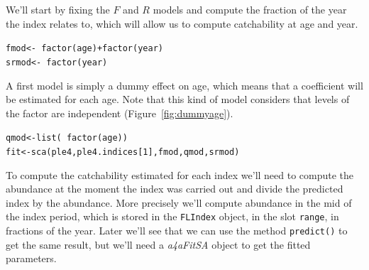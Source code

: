 \documentclass[a4paper,english,10pt]{article}\usepackage[]{graphicx}\usepackage[]{color}
\makeatletter
\newcommand{\hlnum}[1]{\textcolor[rgb]{0.2,0.2,0.2}{#1}}%
\newcommand{\hlopt}[1]{\textcolor[rgb]{0.2,0.2,0.2}{#1}}%
\newcommand{\hlstd}[1]{\textcolor[rgb]{0,0,0}{#1}}%
\newcommand{\hlkwb}[1]{\textcolor[rgb]{0.361,0.506,0.596}{#1}}%
\newcommand{\hlkwd}[1]{\textcolor[rgb]{0.361,0.506,0.596}{#1}}%
\newenvironment{kframe}{%
 \def\at@end@of@kframe{}%
 \ifinner\ifhmode%
  \def\at@end@of@kframe{\end{minipage}}%
  \begin{minipage}{\columnwidth}%
 \fi\fi%
 \def\FrameCommand##1{\hskip\@totalleftmargin \hskip-\fboxsep
 \colorbox{shadecolor}{##1}\hskip-\fboxsep
     \hskip-\linewidth \hskip-\@totalleftmargin \hskip\columnwidth}%
 \MakeFramed {\advance\hsize-\width
   \@totalleftmargin\z@ \linewidth\hsize
   \@setminipage}}%
 {\par\unskip\endMakeFramed%
 \at@end@of@kframe}
\newenvironment{knitrout}{}{} %
\newcommand{\code}[1]{{\texttt{#1}}}
\newcommand{\class}[1]{{\textit{#1}}}
\makeatother
\begin{document}
We'll start by fixing the $F$ and $R$ models and compute the fraction of the year the index relates to, which will allow us to compute catchability at age and year. 

\begin{knitrout}
\color{fgcolor}\begin{kframe}
\begin{alltt}
\hlstd{fmod} \hlkwb{<-} \hlopt{~} \hlkwd{factor}\hlstd{(age)} \hlopt{+} \hlkwd{factor}\hlstd{(year)}
\hlstd{srmod} \hlkwb{<-} \hlopt{~} \hlkwd{factor}\hlstd{(year)}
\end{alltt}
\end{kframe}
\end{knitrout}

A first model is simply a dummy effect on age, which means that a coefficient will be estimated for each age. Note that this kind of model considers that levels of the factor are independent (Figure~\ref{fig:dummyage}).

\begin{knitrout}
\color{fgcolor}\begin{kframe}
\begin{alltt}
\hlstd{qmod} \hlkwb{<-} \hlkwd{list}\hlstd{(}\hlopt{~} \hlkwd{factor}\hlstd{(age))}
\hlstd{fit} \hlkwb{<-} \hlkwd{sca}\hlstd{(ple4, ple4.indices[}\hlnum{1}\hlstd{], fmod, qmod, srmod)}
\end{alltt}
\end{kframe}
\end{knitrout}

To compute the catchability estimated for each index we'll need to compute the abundance at the moment the index was carried out and divide the predicted index by the abundance. More precisely we'll compute abundance in the mid of the index period, which is stored in the \code{FLIndex} object, in the slot \code{range}, in fractions of the year. Later we'll see that we can use the method \code{predict()} to get the same result, but we'll need a \class{a4aFitSA} object to get the fitted parameters.
\end{document}
